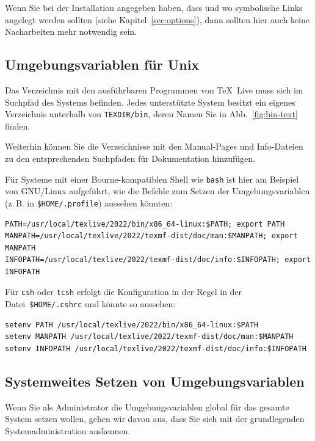 \documentclass[12pt,ngerman,a4paper,fullparskip]{scrreprt}
\newcommand{\TL}{\TeX\ Live\xspace}
\newcommand{\prog}[1]{\texttt{#1}}
\newcommand{\filename}[1]{\texttt{#1}}
\newcommand{\dirname}[1]{\texttt{#1}}
\begin{document}
Wenn Sie bei der Installation angegeben haben, dass und wo symbolische Links angelegt werden sollten (siehe Kapitel~\ref{sec:options}), dann sollten hier auch keine Nacharbeiten mehr notwendig sein.

\subsection{Umgebungsvariablen für Unix}
\label{sec:env}

Das Verzeichnis mit den ausführbaren Programmen von \TL muss sich im Suchpfad des Systems befinden.
Jedes unterstützte System besitzt ein eigenes Verzeichnis unterhalb von \dirname{TEXDIR/bin}, deren
Namen Sie in Abb.~\ref{fig:bin-text} finden.

Weiterhin können Sie die Verzeichnisse mit den Manual-Pages und Info-Dateien zu den entsprechenden
Suchpfaden für Dokumentation hinzufügen.

Für Systeme mit einer Bourne-kompatiblen Shell wie \prog{bash} ist hier am Beispiel von GNU/Linux
aufgeführt, wie die Befehle zum Setzen der Umgebungsvariablen (z.\,B. in \filename{\$HOME/.profile})
aussehen könnten:

\begin{verbatim}
PATH=/usr/local/texlive/2022/bin/x86_64-linux:$PATH; export PATH
MANPATH=/usr/local/texlive/2022/texmf-dist/doc/man:$MANPATH; export MANPATH
INFOPATH=/usr/local/texlive/2022/texmf-dist/doc/info:$INFOPATH; export INFOPATH
\end{verbatim}


\noindent Für \prog{csh} oder \prog{tcsh} erfolgt die Konfiguration in der Regel in der Datei~\filename{\$HOME/.cshrc}
und könnte so aussehen:

\begin{verbatim}
setenv PATH /usr/local/texlive/2022/bin/x86_64-linux:$PATH
setenv MANPATH /usr/local/texlive/2022/texmf-dist/doc/man:$MANPATH
setenv INFOPATH /usr/local/texlive/2022/texmf-dist/doc/info:$INFOPATH
\end{verbatim}

\subsection{Systemweites Setzen von Umgebungsvariablen}
\label{sec:envglobal}


Wenn Sie als Administrator die Umgebungsvariablen global für das gesamte System setzen wollen,
gehen wir davon aus, dass Sie sich mit der grundlegenden Systemadministration auskennen.
\end{document}
